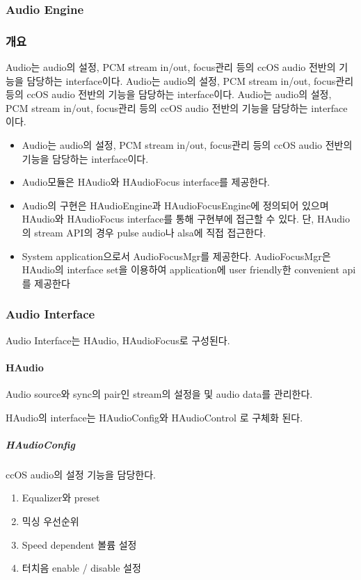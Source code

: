 \subsubsection{Audio Engine}
\subsubsection*{개요} Audio는 audio의 설정, PCM stream in/out, focus관리 등의 ccOS audio 전반의 기능을 담당하는 interface이다. Audio는 audio의 설정, PCM stream in/out, focus관리 등의 ccOS audio 전반의 기능을 담당하는 interface이다. Audio는 audio의 설정, PCM stream in/out, focus관리 등의 ccOS audio 전반의 기능을 담당하는 interface이다.
\begin{itemize}
	\item Audio는 audio의 설정, PCM stream in/out, focus관리 등의 ccOS audio 전반의 기능을 담당하는 interface이다.
	\item Audio모듈은 HAudio와 HAudioFocus interface를 제공한다.
	\item Audio의 구현은 HAudioEngine과 HAudioFocusEngine에 정의되어 있으며 HAudio와 HAudioFocus interface를 통해 구현부에 접근할 수 있다. 단, HAudio의 stream API의 경우 pulse audio나 alsa에 직접 접근한다.
	\item System application으로서 AudioFocusMgr를 제공한다. AudioFocusMgr은 HAudio의 interface set을 이용하여 application에 user friendly한 convenient api를 제공한다
\end{itemize}

\subsubsection*{Audio Interface}
Audio Interface는 HAudio, HAudioFocus로 구성된다. 
	\paragraph{HAudio} Audio source와 sync의 pair인 stream의 설정을 및 audio data를 관리한다.

	HAudio의 interface는 HAudioConfig와 HAudioControl 로 구체화 된다.

	\subparagraph{HAudioConfig}
	ccOS audio의 설정 기능을 담당한다.
	\begin{enumerate}
		\item Equalizer와 preset
		\item 믹싱 우선순위
		\item Speed dependent 볼륨 설정
		\item 터치음 enable / disable 설정
	\end{enumerate}


